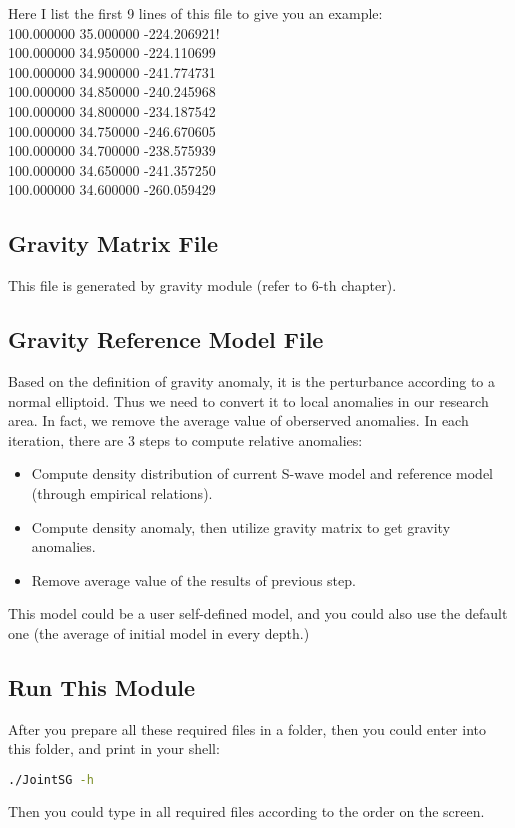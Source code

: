 \documentclass[UTF8]{article}
\begin{document}
    Here I list the first 9 lines of this file to give you an example:\\
    100.000000 35.000000 -224.206921!\\
    100.000000 34.950000 -224.110699\\
    100.000000 34.900000 -241.774731\\
    100.000000 34.850000 -240.245968\\
    100.000000 34.800000 -234.187542\\
    100.000000 34.750000 -246.670605\\
    100.000000 34.700000 -238.575939\\
    100.000000 34.650000 -241.357250\\
    100.000000 34.600000 -260.059429\\

    \subsection{Gravity Matrix File}
    This file is generated by gravity module (refer to 6-th chapter).

    \subsection{Gravity Reference Model File}
    Based on the definition of gravity anomaly, it is the perturbance according 
    to a normal elliptoid. Thus we need to convert it to local anomalies in our research 
    area. In fact, we remove the average value of oberserved anomalies. In each iteration, 
    there are 3 steps to compute relative anomalies:
    \begin{itemize}
        \item Compute density distribution of current S-wave model and reference model (through
            empirical relations).
        \item Compute density anomaly, then utilize gravity matrix to get gravity anomalies.
        \item Remove average value of the results of previous step.
    \end{itemize}
    This model could be a user self-defined model, and you could also use the 
    default one (the average of initial model in every depth.)

    \subsection{Run This Module}
    After you prepare all these required files in a folder, then you could enter into this folder,
    and print in your shell:
    \begin{lstlisting}[language=bash]
    ./JointSG -h
    \end{lstlisting}
    Then you could type in all required files according to the order on the screen.
\end{document}

